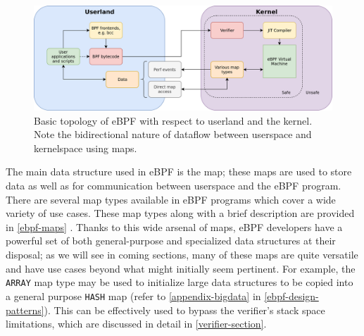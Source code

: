 \documentclass[
  12pt]{findlay}
\newcommand{\passthrough}[1]{#1}
\begin{document}
\begin{figure}
\includegraphics{../figures/eBPF-topology.png}
\caption[Basic topology of eBPF with respect to userland and the kernel]{
Basic topology of eBPF with respect to userland and the kernel.
Note the bidirectional nature of dataflow between userspace and kernelspace
using maps.}
\label{ebpf-topology}
\end{figure}

The main data structure used in eBPF is the map; these maps are used to
store data as well as for communication between userspace and the eBPF
program. There are several map types available in eBPF programs which
cover a wide variety of use cases. These map types along with a brief
description are provided in \autoref{ebpf-maps}
\autocite{man-bpf,fleming17,bcc}. Thanks to this wide arsenal of maps,
eBPF developers have a powerful set of both general-purpose and
specialized data structures at their disposal; as we will see in coming
sections, many of these maps are quite versatile and have use cases
beyond what might initially seem pertinent. For example, the
\passthrough{\lstinline!ARRAY!} map type may be used to initialize large
data structures to be copied into a general purpose
\passthrough{\lstinline!HASH!} map (refer to \autoref{appendix-bigdata}
in \autoref{ebpf-design-patterns}). This can be effectively used to
bypass the verifier's stack space limitations, which are discussed in
detail in \autoref{verifier-section}.
\end{document}
